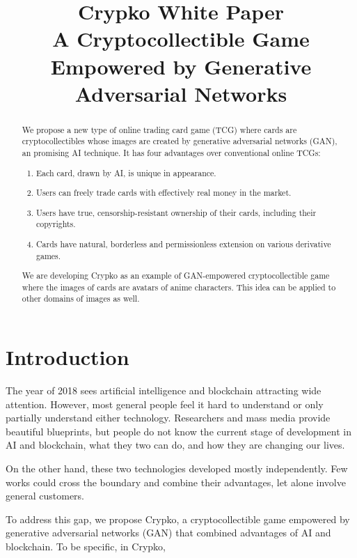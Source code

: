 \documentclass[a4paper]{article}
\title{Crypko White Paper \\
  \large A Cryptocollectible Game Empowered by Generative Adversarial Networks\\
  \rightline{\small ver 0.9.0 for comike}
}
\author{}
\date{}
\begin{document}
\maketitle
\newpage

\begin{abstract}

We propose a new type of online trading card game (TCG) where cards are cryptocollectibles whose images are created by generative adversarial networks (GAN), an promising AI technique. 
It has four advantages over conventional online TCGs:
\begin{enumerate}
\item Each card, drawn by AI, is unique in appearance.
\item Users can freely trade cards with effectively real money in the market.
\item Users have true, censorship-resistant ownership of their cards, including their copyrights.
\item Cards have natural, borderless and permissionless extension on various derivative games. 
\end{enumerate}

We are developing Crypko as an example of GAN-empowered cryptocollectible game where the images of cards are avatars of anime characters.
This idea can be applied to other domains of images as well.

\end{abstract}

\thispagestyle{empty}

\newpage

\section{Introduction}

The year of 2018 sees artificial intelligence and blockchain attracting wide attention.
However, most general people feel it hard to understand or only partially understand either technology. Researchers and mass media provide beautiful blueprints, but people do not know the current stage of development in AI and blockchain, what they two can do, and how they are changing our lives. 

On the other hand, these two technologies developed mostly independently. Few works could cross the boundary and combine their advantages, let alone involve general customers. 

To address this gap, we propose Crypko, a cryptocollectible game empowered by generative adversarial networks (GAN) that combined advantages of AI and blockchain. To be specific, in Crypko,
\end{document}
